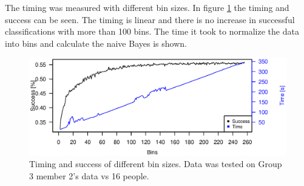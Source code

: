 The timing was measured with different bin sizes. 
In figure \ref{fig:baye_timing} the timing and success can be seen.
The timing is linear and there is no increase in successful classifications with more than 100 bins. 
The time it took to normalize the data into bins and calculate the naive Bayes is shown.

\begin{figure}
\centering
\includegraphics[width = \textwidth]{graphics/baye_timing_bins}
\caption[Timing with different bin sizes]{Timing and success of different bin sizes. Data was tested on Group 3 member 2's data vs 16 people.}
\label{fig:baye_timing}
\end{figure}


